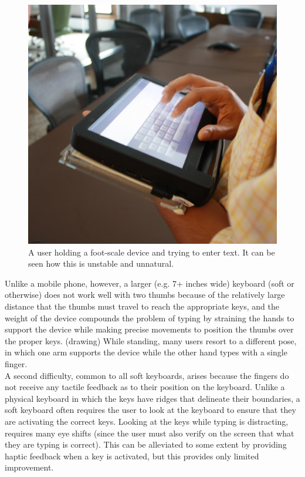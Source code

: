 \begin{figure}
    \includegraphics[scale=0.35]{Figures/device_hold.eps} 
  	\caption{A user holding a foot-scale device and trying to enter text. It can be seen how this is unstable and unnatural.}
\end{figure}
Unlike a mobile phone, however, a larger (e.g. 7+ inches wide) keyboard (soft or otherwise) does not work well with two thumbs because of the relatively large distance that the thumbs must travel to reach the appropriate keys, and the weight of the device compounds the problem of typing by straining the hands to support the device while making precise movements to position the thumbs over the proper keys. (drawing)   While standing, many users resort to a different pose, in which one arm supports the device while the other hand types with a single finger.\\
A second difficulty, common to all soft keyboards, arises because the fingers do not receive any tactile feedback as to their position on the keyboard.  Unlike a physical keyboard in which the keys have ridges that delineate their boundaries, a soft keyboard often requires the user to look at the keyboard to ensure that they are activating the correct keys.  Looking at the keys while typing is distracting, requires many eye shifts (since the user must also verify on the screen that what they are typing is correct).  This can be alleviated to some extent by providing haptic feedback when a key is activated, but this provides only limited improvement.\\ 
